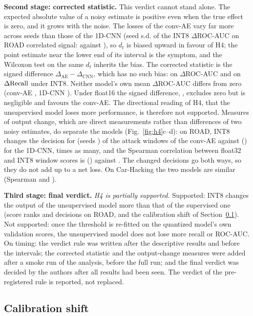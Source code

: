 \textbf{Second stage: corrected statistic.} This verdict cannot stand alone. The expected absolute value of a noisy estimate
is positive even when the true effect is zero, and it grows with the noise. The losses of the conv-AE vary far more
across seeds than those of the 1D-CNN (seed s.d. of the INT8 $\Delta$ROC-AUC on ROAD correlated signal: \SDAECorr{}
against \SDCNNCorr), so $d_t$ is biased upward in favour of H4; the point estimate near the lower end of its interval
is the symptom, and the Wilcoxon test on the same $d_t$ inherits the bias. The corrected statistic is the signed
difference $\Delta_{\mathrm{AE}} - \Delta_{\mathrm{CNN}}$, which has no such bias: \SgnAUCQTwoCI{} on $\Delta$ROC-AUC
and \SgnRecQTwoCI{} on $\Delta\mathrm{Recall}$ under INT8. Neither model's own mean $\Delta$ROC-AUC differs from zero (conv-AE
\MeanAEAUC, 1D-CNN \MeanCNNAUC). Under float16 the signed difference, \SgnAUCQOneCI, excludes zero but is negligible
and favours the conv-AE. The directional reading of H4, that the unsupervised model loses more performance, is
therefore not supported. Measures of output change, which are direct measurements rather than differences of two
noisy estimates, do separate the models (Fig.~\ref{fig:h4}c--d): on ROAD, INT8 changes the decision for \ChurnAEROAD{} (seeds
\ChurnAEROADRange) of the attack windows of the conv-AE against \ChurnCNNROAD{} (\ChurnCNNROADRange) for the 1D-CNN,
\ChurnRatioROAD{} times as many, and the Spearman correlation between float32 and INT8 window scores is \SpearAEROAD{}
(\SpearAEROADRange) against \SpearCNNROAD. The changed decisions go both ways, so they do not add up to a net loss. On
Car-Hacking the two models are similar (Spearman \SpearAECH{} and \SpearCNNCH).

\textbf{Third stage: final verdict.} \emph{H4 is partially supported.} Supported: INT8 changes the output of the
unsupervised model more than that of the supervised one (score ranks and decisions on ROAD, and the calibration shift
of Section~\ref{sec:res-calib}). Not supported: once the threshold is re-fitted on the quantized model's own
validation scores, the unsupervised model does not lose more recall or ROC-AUC. On timing: the verdict rule was written
after the descriptive results and before the intervals; the corrected statistic and the output-change measures were
added after a smoke run of the analysis, before the full run; and the final verdict was decided by the authors after
all results had been seen. The verdict of the pre-registered rule is reported, not replaced.

\subsection{Calibration shift}\label{sec:res-calib}

